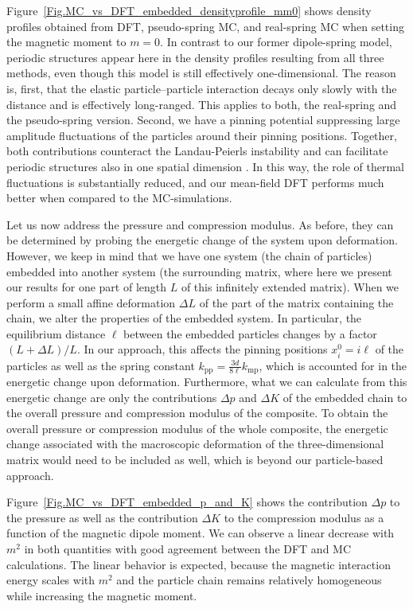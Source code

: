 \documentclass[aps,pre,twocolumn,superscriptaddress,nofootinbib]{revtex4}
\begin{document}
Figure~\ref{Fig.MC_vs_DFT_embedded_densityprofile_mm0} shows density profiles obtained from DFT, pseudo-spring MC, and real-spring MC when setting the magnetic moment to $m = 0$. 
In contrast to our former dipole-spring model, periodic structures appear here in the density profiles resulting from all three methods, even though this model is still effectively one-dimensional. 
The reason is, first, that the elastic particle--particle interaction decays only slowly with the distance and is effectively long-ranged. 
This applies to both, the real-spring and the pseudo-spring version.
Second, we have a pinning potential suppressing large amplitude fluctuations of the particles around their pinning positions. 
Together, both contributions counteract the Landau-Peierls instability and can facilitate periodic structures also in one spatial dimension \cite{Cuesta2004_JStatPhys,Wong1997_Nature,Dyson1969_CummunMathPhys,Ruelle1968_CommunMathPhys,VanHove1952_Physica}. 
In this way, the role of thermal fluctuations is substantially reduced, and our mean-field DFT performs much better when compared to the MC-simulations. 

Let us now address the pressure and compression modulus. 
As before, they can  be determined by probing the energetic change of the system upon deformation. 
However, we keep in mind that we have one system (the chain of particles) embedded into another system (the surrounding matrix, where here we present our results for one part of length $L$ of this infinitely extended matrix). 
When we perform a small affine deformation $\Delta L$ of the part of the matrix containing the chain, we alter the properties of the embedded system. 
In particular, the equilibrium distance $\ell$ between the embedded particles changes by a factor $(L + \Delta L)/L$. 
In our approach, this affects the pinning positions $x_i^{0} = i\ell$ of the particles as well as the spring constant $k_\textrm{pp} = \frac{3d}{8\ell} k_\textrm{mp}$, which is accounted for in the energetic change upon deformation. 
Furthermore, what we can calculate from this energetic change are only the contributions $\Delta p$ and $\Delta K$ of the embedded chain to the overall pressure and compression modulus of the composite. 
To obtain the overall pressure or compression modulus of the whole composite, the energetic change associated with the macroscopic deformation of the three-dimensional matrix would need to be included as well, which is beyond our particle-based approach. 

Figure~\ref{Fig.MC_vs_DFT_embedded_p_and_K} shows the contribution $\Delta p$ to the pressure as well as the contribution $\Delta K$ to the compression modulus as a function of the magnetic dipole moment. 
We can observe a linear decrease with $m^2$ in both quantities with good agreement between the DFT and MC calculations. 
The linear behavior is expected, because the magnetic interaction energy scales with $m^2$ and the particle chain remains relatively homogeneous while increasing the magnetic moment. 
\end{document}
